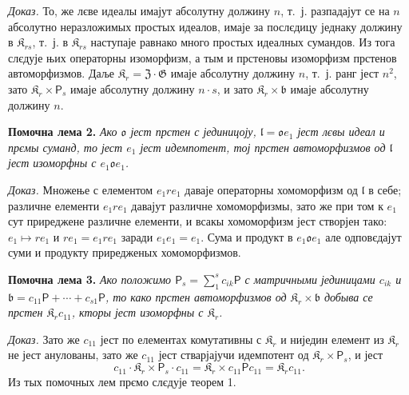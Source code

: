 \documentclass[11pt]{article}
\begin{document}
\noindent\emph{Доказ.} То, же лєве идеалы имајут абсолутну должину \(n\), т.~ј. разпадајут се на \(n\) абсолутно неразложимых простых идеалов, имаје за послєдицу једнаку должину в \(\mathfrak K_{rs}\), т.~ј. в \(\mathfrak K_{rs}\) наступаје равнако много простых идеалных сумандов. Из тога слєдује њих операторны изоморфизм, а тым и прстеновы изоморфизм прстенов автоморфизмов. Даље \(\mathfrak K_r=\mathfrak Z\cdot\mathfrak G\) имаје абсолутну должину \(n\), т.~ј. ранг јест \(n^2\), зато \(\mathfrak K_r\times \mathsf{P}_s\) имаје абсолутну должину \(n\cdot s\), и зато \(\mathfrak K_r\times\mathfrak b\) имаје абсолутну должину \(n\).

\noindent\textbf{Помочна лема 2.} \emph{Ако \(\mathfrak o\) јест прстен с јединицоју, \(\mathfrak l=\mathfrak o e_1\) јест лєвы идеал и прємы суманд, то јест \(e_1\) јест идемпотент, тој прстен автоморфизмов од \(\mathfrak l\) јест изоморфны с \(e_1\mathfrak o e_1\).}

\noindent\emph{Доказ.} Множење с елементом \(e_1re_1\) даваје операторны хомоморфизм од \(\mathfrak l\) в себе; различне елементи \(e_1re_1\) давајут различне хомоморфизмы, зато же при том к \(e_1\) сут приреджене различне елементи, и всакы хомоморфизм јест створјен тако: \(e_1\mapsto re_1\) и \(re_1=e_1re_1\) заради \(e_1e_1=e_1\). Сума и продукт в \(e_1\mathfrak o e_1\) але одповєдајут суми и продукту приредженых хомоморфизмов.

\noindent\textbf{Помочна лема 3.} \emph{Ако положимо \(\mathsf{P}_s=\sum_1^s c_{ik}\mathsf{P}\) с матричными јединицами \(c_{ik}\) и \(\mathfrak b=c_{11}\mathsf{P}+\cdots+c_{s1}\mathsf{P}\), то како прстен автоморфизмов од \(\mathfrak K_r\times\mathfrak b\) добыва се прстен \(\mathfrak K_rc_{11}\), кторы јест изоморфны с \(\mathfrak K_r\).}

\noindent\emph{Доказ.} Зато же \(c_{11}\) јест по елементах комутативны с \(\mathfrak K_r\) и ниједин елемент из \(\mathfrak K_r\) не јест анулованы, зато же \(c_{11}\) јест стварјајучи идемпотент од \(\mathfrak K_r\times \mathsf{P}_s\), и јест
\[
c_{11}\cdot\mathfrak K_r\times \mathsf{P}_s\cdot c_{11}
=\mathfrak K_r\times c_{11}\mathsf Pc_{11}
=\mathfrak K_rc_{11}.
\]
Из тых помочных лем прємо слєдује теорем 1.
\end{document}
